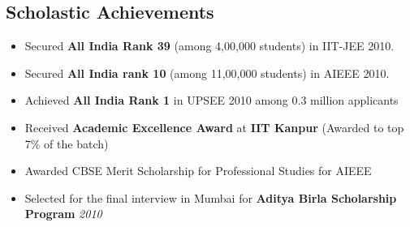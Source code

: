 \documentclass[margin,line]{resume}
\begin{document}
\begin{resume}
  \section{\mysidestyle Scholastic Achievements}
  \begin{itemize}
  \item Secured \textbf{\textsf{All India Rank 39}} (among 4,00,000 students) in IIT-JEE 2010.
  \item Secured \textbf{\textsf{All India rank 10}} (among 11,00,000 students) in AIEEE 2010.
  \item Achieved \textbf{\textsf{All India Rank 1}} in UPSEE 2010 among 0.3 million applicants
  \item Received \textbf{\textsf{Academic Excellence Award}} at \textsf{\textbf{IIT Kanpur}} (Awarded to top 7\% of the batch)
  \item Awarded CBSE Merit Scholarship for Professional Studies for AIEEE    
  \item Selected for the final interview in Mumbai for \textbf{\textsf{Aditya Birla Scholarship Program}} \hfill \emph{2010}
  \end{itemize}


\end{resume}
\end{document}

